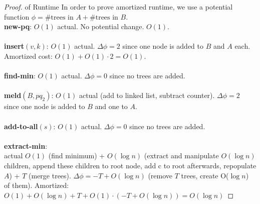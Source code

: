 \documentclass{article}
\theoremstyle{casestyle}
\begin{document}
\begin{proof} of Runtime
In order to prove amortized runtime, we use a potential function $\phi=\text{\# trees in } A + \text{\# trees in } B$.\\
\textbf{new-pq}: $O(1)$ actual. No potential change. $O(1)$.\\\\
\textbf{insert}$(v,k)$: $O(1)$ actual. $\Delta \phi = 2$ since one node is added to $B$ and $A$ each. Amortized cost: $O(1) + O(1) \cdot 2 = O(1)$.\\\\
\textbf{find-min}: $O(1)$ actual. $\Delta \phi = 0$ since no trees are added.\\\\
\textbf{meld}$(B,pq_2)$: $O(1)$ actual (add to linked list, subtract counter). $\Delta \phi = 2$ since one node is added to $B$ and one to $A$. \\\\
\textbf{add-to-all}$(s)$: $O(1)$ actual. $\Delta \phi = 0$ since no trees are added.\\\\
\textbf{extract-min}: \\ actual $O(1)$ (find minimum) + $O(\log n)$ (extract and manipulate $O(\log n)$ children, append these children to root node, add c to root afterwards, repopulate $A$) + $T$ (merge trees). $\Delta \phi = -T + O(\log n)$ (remove $T$ trees, create O($\log n$) of them). Amortized: $O(1) + O(\log n) + T + O(1) \cdot (-T + O(\log n)) = O(\log n)$
\end{proof}
\end{document}
